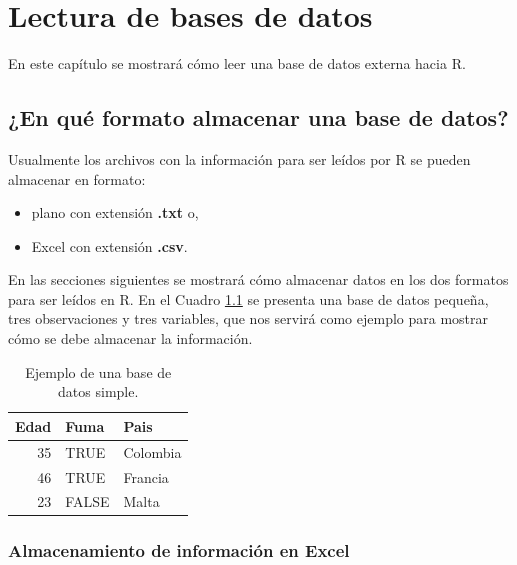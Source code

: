 \documentclass[10pt,]{krantz}
\providecommand{\tightlist}{%
  \setlength{\itemsep}{0pt}\setlength{\parskip}{0pt}}
\let\proglang=\textsf
\begin{document}
\chapter{\texorpdfstring{Lectura de bases de datos
\label{read}}{Lectura de bases de datos  }}\label{lectura-de-bases-de-datos}

En este capítulo se mostrará cómo leer una base de datos externa hacia
\proglang{R}.

\section{\texorpdfstring{¿En qué formato almacenar una base de datos?
}{¿En qué formato almacenar una base de datos?  }}\label{en-que-formato-almacenar-una-base-de-datos}

Usualmente los archivos con la información para ser leídos por
\proglang{R} se pueden almacenar en formato:

\begin{itemize}
\tightlist
\item
  plano con extensión \textbf{.txt} o,
\item
  Excel con extensión \textbf{.csv}.
\end{itemize}

En las secciones siguientes se mostrará cómo almacenar datos en los dos
formatos para ser leídos en \proglang{R}. En el Cuadro \ref{tab:dt1} se
presenta una base de datos pequeña, tres observaciones y tres variables,
que nos servirá como ejemplo para mostrar cómo se debe almacenar la
información.

\begin{table}

\caption{\label{tab:dt1}Ejemplo de una base de datos simple.}
\centering
\begin{tabular}[t]{rll}
\toprule
Edad & Fuma & Pais\\
\midrule
35 & TRUE & Colombia\\
46 & TRUE & Francia\\
23 & FALSE & Malta\\
\bottomrule
\end{tabular}
\end{table}

\subsection{\texorpdfstring{Almacenamiento de información en Excel
}{Almacenamiento de información en Excel }}\label{almacenamiento-de-informacion-en-excel}
\end{document}
